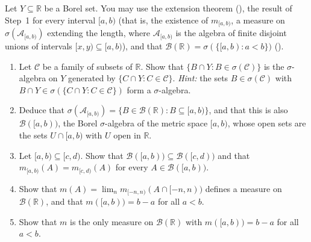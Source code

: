 \begin{exercise}\label{ex:mf-steps}
\medium Let $Y\subseteq\mathbb R$ be a Borel set. You may use the extension theorem
(), the result of Step~1 for every interval $[a,b)$ (that is, the
existence of $m_{[a,b)}$, a measure on $\sigma(\mathcal A_{[a,b)})$ extending the length, where
$\mathcal A_{[a,b)}$ is the algebra of finite disjoint unions of intervals $[x,y)\subseteq[a,b)$),
and that $\mathcal B(\mathbb R)=\sigma(\{[a,b):a<b\})$ ().
\begin{enumerate}[label=(\alph*)]
  \item Let $\mathcal C$ be a family of subsets of $\mathbb R$. Show that
    $\{B\cap Y:B\in\sigma(\mathcal C)\}$ is the $\sigma$-algebra on $Y$ generated by
    $\{C\cap Y:C\in\mathcal C\}$. \emph{Hint:} the sets $B\in\sigma(\mathcal C)$ with
    $B\cap Y\in\sigma(\{C\cap Y:C\in\mathcal C\})$ form a $\sigma$-algebra.
  \item Deduce that $\sigma(\mathcal A_{[a,b)})=\{B\in\mathcal B(\mathbb R):B\subseteq[a,b)\}$, and
    that this is also $\mathcal B([a,b))$, the Borel $\sigma$-algebra of the metric space
    $[a,b)$, whose open sets are the sets $U\cap[a,b)$ with $U$ open in $\mathbb R$.
  \item Let $[a,b)\subseteq[c,d)$. Show that $\mathcal B([a,b))\subseteq\mathcal B([c,d))$ and
    that $m_{[a,b)}(A)=m_{[c,d)}(A)$ for every $A\in\mathcal B([a,b))$.
  \item Show that $m(A)=\lim_nm_{[-n,n)}(A\cap[-n,n))$ defines a measure on
    $\mathcal B(\mathbb R)$, and that $m([a,b))=b-a$ for all $a<b$.
  \item Show that $m$ is the only measure on $\mathcal B(\mathbb R)$ with $m([a,b))=b-a$ for all
    $a<b$.
\end{enumerate}
\end{exercise}


